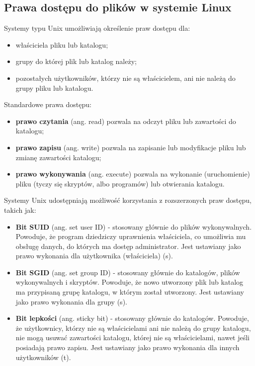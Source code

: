\documentclass{article}
\begin{document}
\subsection{Prawa dostępu do plików w systemie Linux}
Systemy typu Unix umożliwiają określenie praw dostępu dla:
\begin{itemize}
    \item właściciela pliku lub katalogu;
    \item grupy do której plik lub katalog należy;
    \item pozostałych użytkowników, którzy nie są właścicielem, ani nie należą do grupy pliku lub katalogu.
\end{itemize}
Standardowe prawa dostępu:
\begin{itemize}
    \item \textbf{prawo czytania} (ang. read) pozwala na odczyt pliku lub zawartości do katalogu;
    \item \textbf{prawo zapisu} (ang. write) pozwala na zapisanie lub modyfikacje pliku lub zmianę zawartości katalogu;
    \item \textbf{prawo wykonywania} (ang. execute) pozwala na wykonanie (uruchomienie) pliku (tyczy się skryptów, albo programów) lub otwierania katalogu.
\end{itemize}

Systemy Unix udostępniają możliwość korzystania z rozszerzonych praw dostępu, takich jak:

\begin{itemize}
    \item \textbf{Bit SUID} (ang. set user ID) - stosowany głównie do plików wykonywalnych. Powoduje, że program dziedziczy uprawnienia właściciela, co umożliwia mu obsługę danych, do których ma dostęp administrator. Jest ustawiany jako prawo wykonania dla użytkownika (właściciela) (s).

    \item \textbf{Bit SGID} (ang. set group ID) - stosowany głównie do katalogów, plików wykonywalnych i skryptów. Powoduje, że nowo utworzony plik lub katalog ma przypisaną grupę katalogu, w którym został utworzony. Jest ustawiany jako prawo wykonania dla grupy (s).

    \item \textbf{Bit lepkości} (ang. sticky bit) - stosowany głównie do katalogów. Powoduje, że użytkownicy, którzy nie są właścicielami ani nie należą do grupy katalogu, nie mogą usuwać zawartości katalogu, której nie są właścicielami, nawet jeśli posiadają prawo zapisu. Jest ustawiany jako prawo wykonania dla innych użytkowników (t).
\end{itemize}
\end{document}

